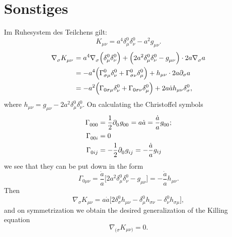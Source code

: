 \documentclass[10pt,oneside,a4paper]{scrartcl}
\let\originalleft\left  %
\let\originalright\right
\renewcommand{\left}{\mathopen{}\mathclose\bgroup\originalleft}
\renewcommand{\right}{\aftergroup\egroup\originalright}
\theoremstyle{definition}
\theoremstyle{remark}
\begin{document}
\section{Sonstiges}
Im Ruhesystem des Teilchens gilt:
\begin{equation}K_{\mu\nu}=a^{4}\delta_{\mu}^{0}\delta_{\nu}^{0}
-a^{2}g_{\mu\nu}.\end{equation}
\begin{align*}
\tensor{\nabla}{_\sigma}\tensor{K}{_\mu_\nu}&
=a^4\tensor{\nabla}{_\sigma}
\left(\tensor*{\delta}{_\mu^0}\tensor*{\delta}{_\nu^0}\right)
+\left(2a^{2}\tensor*{\delta}{_\mu^0}\tensor*{\delta}{_\nu^0}
-\tensor{g}{_\mu_\nu}\right)\cdot 2a\tensor{\nabla}{_\sigma}a\\
&=-a^{4}
\left(\tensor*{\Gamma}{^0_\sigma_\mu}\tensor*{\delta}{_\nu^0}
+\tensor*{\Gamma}{^0_\sigma_\nu}\tensor*{\delta}{_\mu^0}\right)
+h_{\mu\nu}\cdot 2a\partial_{\sigma}a\\
&=-a^{2}
\left(\Gamma_{0\sigma\mu}\delta_{\nu}^{0}
+\Gamma_{0\sigma\nu}\delta_{\mu}^{0}\right)
+2a\dot{a}h_{\mu\nu}\delta_{\sigma}^{0},
\end{align*}
where $h_{\mu\nu}=g_{\mu\nu}
-2a^{2}\delta_{\mu}^{0}\delta_{\nu}^{0}$.
On calculating the Christoffel symbols
\begin{align*}
\tensor*{\Gamma}{_0_0_0}&=\frac{1}{2}\tensor{\partial}{_0}\tensor{g}{_0_0}
=a\dot{a}=\frac{\dot{a}}{a}\tensor{g}{_0_0};\\
\tensor*{\Gamma}{_0_0_i}&=0\\
\tensor*{\Gamma}{_0_i_j}&=-\frac{1}{2}\tensor{\partial}{_0}\tensor{g}{_i_j}
=-\frac{\dot{a}}{a}g_{ij}
\end{align*}
we see that they can be put down in the form
\begin{equation}\Gamma_{0\mu\nu}=\frac{\dot{a}}{a}
\big[2a^2\delta_{\mu}^{0}\delta_{\nu}^{0}
-g_{\mu\nu}\big]=
-\frac{\dot{a}}{a}h_{\mu\nu}.\end{equation}
Then
\begin{equation}\nabla_{\sigma}K_{\mu\nu}
=a\dot{a}\big[
2\delta_{\sigma}^{0}h_{\mu\nu}
-\delta_{\mu}^{0}h_{\sigma\nu}
-\delta_{\nu}^{0}h_{\sigma\mu}\big],\end{equation}
and on symmetrization we obtain the desired generalization of the Killing equation
\begin{equation}\nabla_{(\sigma}K_{\mu\nu)}=0.\end{equation}
\end{document}
